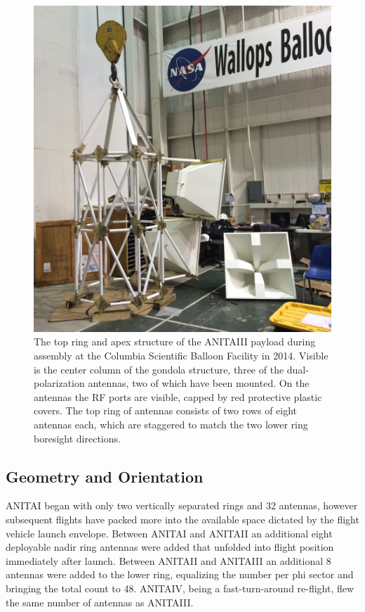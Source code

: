 \begin{figure}
\centering
	\includegraphics[width=\textwidth]{figures/AntennaAssembly}
	\caption{The top ring and apex structure of the ANITAIII payload during assembly at the Columbia Scientific Balloon Facility in 2014.  Visible is the center column of the gondola structure, three of the dual-polarization antennas, two of which have been mounted.  On the antennas the RF ports are visible, capped by red protective plastic covers.  The top ring of antennas consists of two rows of eight antennas each, which are staggered to match the two lower ring boresight directions.}
	\label{fig:antennaAssembly}
\end{figure}	
	
\subsection{Geometry and Orientation}
	ANITAI began with only two vertically separated rings and 32 antennas, however subsequent flights have packed more into the available space dictated by the flight vehicle launch envelope.  Between ANITAI and ANITAII an additional eight deployable nadir ring antennas were added that unfolded into flight position immediately after launch.  Between ANITAII and ANITAIII an additional 8 antennas were added to the lower ring, equalizing the number per phi sector and bringing the total count to 48.  ANITAIV, being a fast-turn-around re-flight, flew the same number of antennas as ANITAIII.  
	
